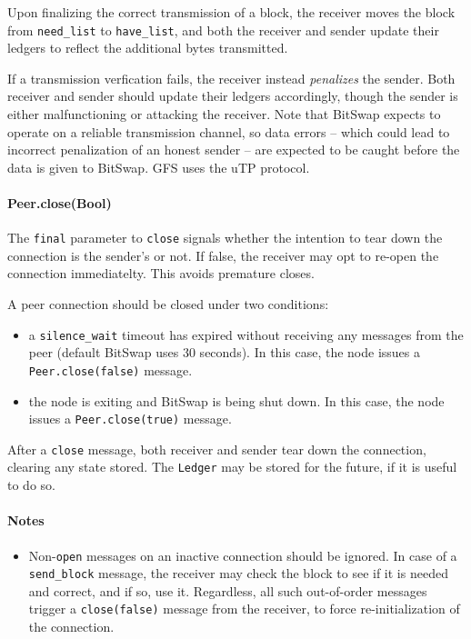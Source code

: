 \documentclass{sig-alternate}
\begin{document}
Upon finalizing the correct transmission of a block, the receiver moves the
block from \texttt{need\_list} to \texttt{have\_list}, and both the receiver
and sender update their ledgers to reflect the additional bytes transmitted.

If a transmission verfication fails, the receiver instead \textit{penalizes}
the sender. Both receiver and sender should update their ledgers accordingly,
though the sender is either malfunctioning or attacking the receiver. Note that
BitSwap expects to operate on a reliable transmission channel, so data errors
-- which could lead to incorrect penalization of an honest sender -- are
expected to be caught before the data is given to BitSwap. GFS uses the uTP
protocol.

\paragraph{Peer.close(Bool)}

The \texttt{final} parameter to \texttt{close} signals whether the intention
to tear down the connection is the sender's or not. If false, the receiver
may opt to re-open the connection immediatelty. This avoids premature
closes.

A peer connection should be closed under two conditions:
\begin{itemize}
  \item a \texttt{silence\_wait} timeout has expired without receiving any
        messages from the peer (default BitSwap uses 30 seconds).
        In this case, the node issues a \texttt{Peer.close(false)} message.
  \item the node is exiting and BitSwap is being shut down.
        In this case, the node issues a \texttt{Peer.close(true)} message.
\end{itemize}

After a \texttt{close} message, both receiver and sender tear down the
connection, clearing any state stored. The \texttt{Ledger} may be stored for
the future, if it is useful to do so.

\paragraph{Notes}

\begin{itemize}
  \item Non-\texttt{open} messages on an inactive connection should be ignored.
        In case of a \texttt{send\_block} message, the receiver may check
        the block to see if it is needed and correct, and if so, use it.
        Regardless, all such out-of-order messages trigger a
        \texttt{close(false)} message from the receiver, to force
        re-initialization of the connection.
\end{itemize}
\end{document}
